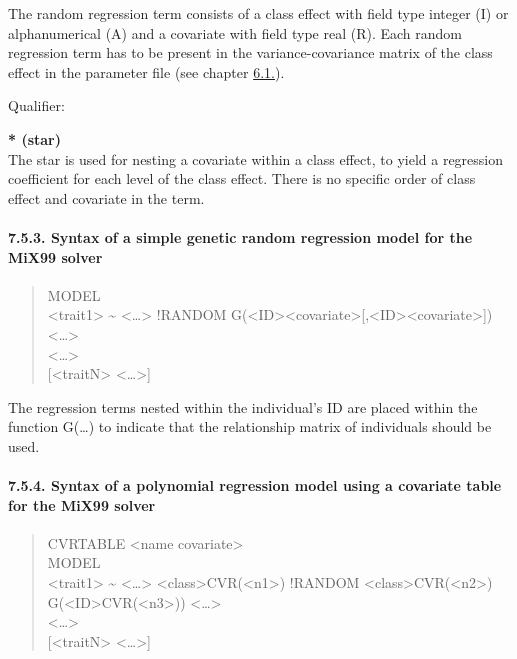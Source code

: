 The random regression term consists of a class effect with field type
integer (I) or alphanumerical (A) and a covariate with field type real
(R). Each random regression term has to be present in the
variance-covariance matrix of the class effect in the parameter file
(see chapter \hyperref[Comp02]{6.1.}).

Qualifier:

\textbf{* (star)}\\
The star is used for nesting a covariate within a class effect, to yield
a regression coefficient for each level of the class effect. There is no
specific order of class effect and covariate in the term.

\paragraph{7.5.3. Syntax of a simple genetic random regression model for
the MiX99 solver}\label{Stat23}

\begin{quote}
MODEL\\
\textless trait1\textgreater{} \textasciitilde{}
\textless\ldots\textgreater{} !RANDOM
G(\textless ID\textgreater*\textless covariate\textgreater{[},\textless ID\textgreater*\textless covariate\textgreater{]})
\textless\ldots\textgreater{}\\
\textless\ldots\textgreater{}\\
{[}\textless traitN\textgreater{} \textless\ldots\textgreater{]}
\end{quote}

The regression terms nested within the individual's ID are placed within
the function G(\ldots) to indicate that the relationship matrix of
individuals should be used.

\paragraph{7.5.4. Syntax of a polynomial regression model using a
covariate table for the MiX99 solver}\label{Stat24}

\begin{quote}
CVRTABLE \textless name covariate\textgreater{}\\
MODEL\\
\textless trait1\textgreater{} \textasciitilde{}
\textless\ldots\textgreater{}
\textless class\textgreater*CVR(\textless n1\textgreater) !RANDOM
\textless class\textgreater*CVR(\textless n2\textgreater)
G(\textless ID\textgreater*CVR(\textless n3\textgreater))
\textless\ldots\textgreater{}\\
\textless\ldots\textgreater{}\\
{[}\textless traitN\textgreater{} \textless\ldots\textgreater{]}
\end{quote}

